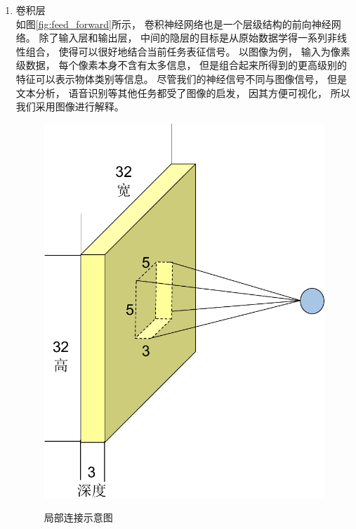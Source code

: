 \begin{enumerate}

\item 卷积层\\
如图\ref{fig:feed_forward}所示， 卷积神经网络也是一个层级结构的前向神经网络。 除了输入层和输出层， 中间的隐层的目标是从原始数据学得一系列非线性组合， 使得可以很好地结合当前任务表征信号。 以图像为例， 输入为像素级数据， 每个像素本身不含有太多信息， 但是组合起来所得到的更高级别的特征可以表示物体类别等信息。 尽管我们的神经信号不同与图像信号， 但是文本分析\cite{collobert2008unified}， 语音识别等其他任务都受了图像的启发， 因其方便可视化， 所以我们采用图像进行解释。


\begin{figure}[htb]
  \centering
  \includegraphics[scale=0.7]{Pictures/CNN/single_layer-crop.pdf}\\
  \caption{局部连接示意图}\label{fig:local_connectivity}
\end{figure}



\end{enumerate}
